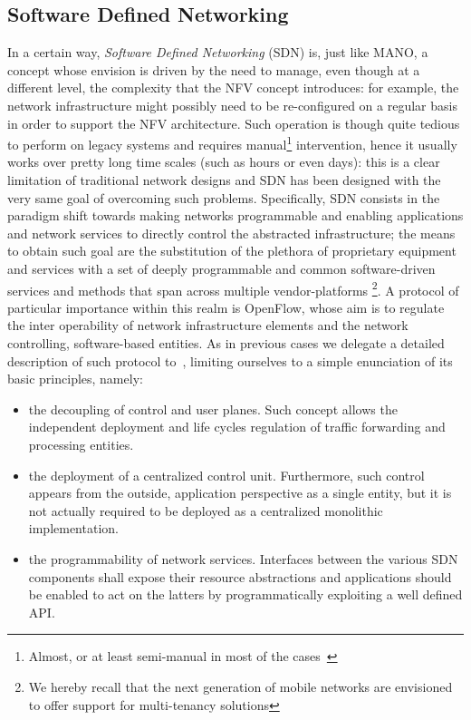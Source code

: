\documentclass[11pt]{book}
\begin{document}
\subsection{Software Defined Networking}
In a certain way, \textit{Software Defined Networking} (SDN) is, just like MANO, a concept whose envision is driven by the need to manage, even though at a different level, the complexity that the NFV concept introduces: for example, the network infrastructure might possibly need to be re-configured on a regular basis in order to support the NFV architecture. Such operation is though quite tedious to perform on legacy systems and requires manual\footnote{Almost, or at least semi-manual in most of the cases~\cite{yousaf2017nfv}} intervention, hence it usually works over pretty long time scales (such as hours or even days): this is a clear limitation of traditional network designs and SDN has been designed with the very same goal of overcoming such problems. Specifically, SDN consists in the paradigm shift towards making networks programmable and enabling applications and network services to directly control the abstracted infrastructure; the means to obtain such goal are the substitution of the plethora of proprietary equipment and services with a set of deeply programmable and common software-driven services and methods that span across multiple vendor-platforms \footnote{We hereby recall that the next generation of mobile networks are envisioned to offer support for multi-tenancy solutions}. 
A protocol of particular importance within this realm is OpenFlow, whose aim is  to regulate the inter operability of network infrastructure elements and the network controlling, software-based entities. As in previous cases we delegate a detailed description of such protocol to~\cite{yousaf2017nfv, onfSpec}, limiting ourselves to a simple enunciation of its basic principles, namely:
\begin{itemize}[noitemsep, topsep=0.2pt]
\item the decoupling of control and user planes. Such concept allows the independent deployment and life cycles regulation of traffic forwarding and processing entities.
\item the deployment of a centralized control unit. Furthermore, such control appears from the outside, application perspective as a single entity, but it is not actually required to be deployed as a centralized monolithic implementation.
\item the programmability of network services. Interfaces between the various SDN components shall expose their resource abstractions and applications should be enabled to act on the latters by programmatically exploiting a well defined API.
\end{itemize}
\end{document}
